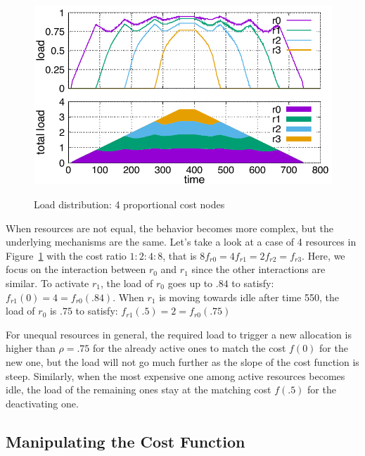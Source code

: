 \begin{figure}
  \begin{center}
    \includegraphics[width=1.0\columnwidth]{4node-ratio.pdf}
    \vspace{-2.0ex}
    \caption{Load distribution: 4 proportional cost nodes}
    \label{fig:4node-ratio}
  \end{center}
\end{figure}

When resources are not equal, the behavior becomes more complex, but
the underlying mechanisms are the same.
Let's take a look at a case of 4 resources in Figure~\ref{fig:4node-ratio}
with the cost ratio $1:2:4:8$,
that is $8 f_{r0} = 4 f_{r1} = 2 f_{r2} = f_{r3}$.
Here, we focus on the interaction between $r_{0}$ and $r_{1}$ since
the other interactions are similar.
To activate $r_{1}$, the load of $r_{0}$ goes up to $.84$ to satisfy:
$f_{r1}(0) = 4 = f_{r0}(.84)$.
When $r_{1}$ is moving towards idle after time 550, the load
of $r_{0}$ is $.75$ to satisfy: $f_{r1}(.5) = 2 = f_{r0}(.75)$

For unequal resources in general, the required load to trigger a new
allocation is higher than $\rho = .75$ for the already
active ones to match the cost $f(0)$ for the new one, but the load
will not go much further as the slope of the cost function is steep.
Similarly, when the most expensive one among active resources becomes
idle, the load of the remaining ones stay at the matching cost 
$f(.5)$ for the deactivating one.


\subsection{Manipulating the Cost Function}
\label{sec:variation}

